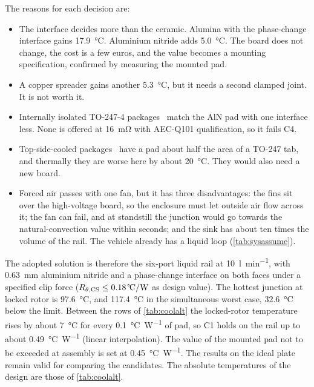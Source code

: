 The reasons for each decision are:
\begin{itemize}
  \item The interface decides more than the ceramic. Alumina with the
        phase-change interface gains \SI{17.9}{\celsius}. Aluminium nitride
        adds \SI{5.0}{\celsius}. The board does not change, the cost is a few
        euros, and the value becomes a mounting specification, confirmed by
        measuring the mounted pad.
  \item A copper spreader gains another \SI{5.3}{\celsius}, but it needs a
        second clamped joint. It is not worth it.
  \item Internally isolated TO-247-4 packages~\cite{littelfuse_iso247,navitas_uhviso}
        match the AlN pad with one interface less. None is offered at
        \SI{16}{\milli\ohm} with AEC-Q101 qualification, so it fails C4.
  \item Top-side-cooled packages~\cite{infineon_aimcq} have a pad about half
        the area of a TO-247 tab, and thermally they are worse here by about
        \SI{20}{\celsius}. They would also need a new board.
  \item Forced air passes with one fan, but it has three disadvantages:
        the fins sit over the high-voltage board, so the enclosure must let
        outside air flow across it; the fan can fail, and at standstill the
        junction would go towards the natural-convection value within
        seconds; and the sink has about ten times the volume of the rail.
        The vehicle already has a liquid loop (\cref{tab:sysassume}).
\end{itemize}

The adopted solution is therefore the six-port liquid rail at
\SI{10}{\litre\per\minute}, with \SI{0.63}{\milli\metre} aluminium nitride
and a phase-change interface on both faces under a specified clip force
($\Rthcs \leq \SI{0.18}{\celsius\per\watt}$ as design value). The hottest
junction at locked rotor is \SI{97.6}{\celsius}, and \SI{117.4}{\celsius} in
the simultaneous worst case, \SI{32.6}{\celsius} below the limit. Between
the rows of \cref{tab:coolalt} the locked-rotor temperature rises by about
\SI{7}{\celsius} for every \SI{0.1}{\celsius\per\watt} of pad, so C1 holds on
the rail up to about \SI{0.49}{\celsius\per\watt} (linear interpolation).
The value of the mounted pad not to be exceeded at assembly is set at
\SI{0.45}{\celsius\per\watt}. The results on the ideal plate
remain valid for comparing the candidates. The absolute temperatures of the
design are those of \cref{tab:coolalt}.

